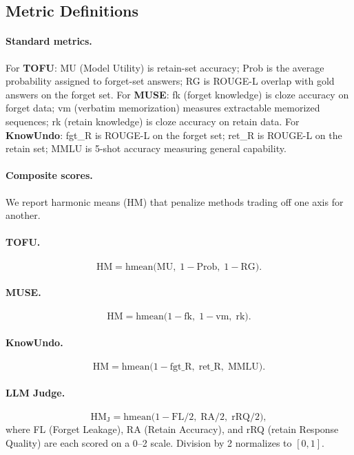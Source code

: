 \subsection{Metric Definitions}
\label{app:metrics}

\paragraph{Standard metrics.}
For \textbf{TOFU}: MU (Model Utility) is retain-set accuracy; Prob is the average probability assigned to forget-set answers; RG is ROUGE-L overlap with gold answers on the forget set.
For \textbf{MUSE}: fk (forget knowledge) is cloze accuracy on forget data; vm (verbatim memorization) measures extractable memorized sequences; rk (retain knowledge) is cloze accuracy on retain data.
For \textbf{KnowUndo}: fgt\_R is ROUGE-L on the forget set; ret\_R is ROUGE-L on the retain set; MMLU is 5-shot accuracy measuring general capability.

\paragraph{Composite scores.}
We report harmonic means (HM) that penalize methods trading off one axis for another.

\paragraph{TOFU.}
\[
\text{HM} = \text{hmean}\bigl(\text{MU},\; 1{-}\text{Prob},\; 1{-}\text{RG}\bigr).
\]

\paragraph{MUSE.}
\[
\text{HM} = \text{hmean}\bigl(1{-}\text{fk},\; 1{-}\text{vm},\; \text{rk}\bigr).
\]

\paragraph{KnowUndo.}
\[
\text{HM} = \text{hmean}\bigl(1{-}\text{fgt\_R},\; \text{ret\_R},\; \text{MMLU}\bigr).
\]

\paragraph{LLM Judge.}
\[
\text{HM}_\text{J} = \text{hmean}\bigl(1{-}\text{FL}/2,\; \text{RA}/2,\; \text{rRQ}/2\bigr),
\]
where FL (Forget Leakage), RA (Retain Accuracy), and rRQ (retain Response Quality) are each scored on a 0--2 scale. Division by 2 normalizes to $[0,1]$.

